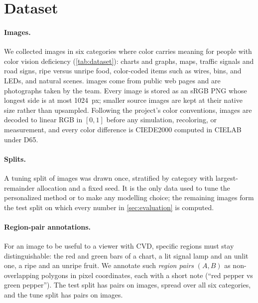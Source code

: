 \section{Dataset}
\label{sec:data}

\paragraph{Images.}
We collected \NumImages{} images in six categories where color carries meaning for people
with color vision deficiency (\cref{tab:dataset}): charts and graphs, maps, traffic signals
and road signs, ripe versus unripe food, color-coded items such as wires, bins, and LEDs, and
natural scenes. \NumWebImages{} images come from public web pages and \NumTeamPhotos{} are
photographs taken by the team. Every image is stored as an sRGB PNG whose longest side is at
most 1024~px; smaller source images are kept at their native size rather than upsampled.
Following the project's color conventions, images are decoded to linear RGB in $[0,1]$ before
any simulation, recoloring, or measurement, and every color difference is CIEDE2000
\cite{luo2001,sharma2005} computed in CIELAB under D65.

\paragraph{Splits.}
A tuning split of \NumTune{} images was drawn once, stratified by category with largest-remainder
allocation and a fixed seed. It is the only data used to tune the personalized method or to
make any modelling choice; the remaining \NumTest{} images form the test split on which every
number in \cref{sec:evaluation} is computed.

\begin{table}[t]
  \centering
  \small
  
  \caption{Dataset composition. \emph{Annot.\ test}: test images with region-pair
  annotations. In addition, \NumAnnotTune{} tune images carry \NumPairsTune{} pairs, used
  only for tuning.}
  \label{tab:dataset}
\end{table}

\paragraph{Region-pair annotations.}
For an image to be useful to a viewer with CVD, specific regions must stay distinguishable:
the red and green bars of a chart, a lit signal lamp and an unlit one, a ripe and an unripe
fruit. We annotate such \emph{region pairs} $(A, B)$ as non-overlapping polygons in pixel
coordinates, each with a short note (\eg ``red pepper vs green pepper''). The test split has
\NumPairsTest{} pairs on \NumAnnotTest{} images, spread over all six categories, and the tune
split has \NumPairsTune{} pairs on \NumAnnotTune{} images.

